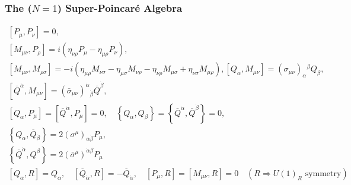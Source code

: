 \documentclass[10pt,aspectratio=169]{beamer}
\begin{document}
\begin{frame}
  \frametitle{The ($N = 1$) Super-Poincar\'{e} Algebra}
  \begin{gather*}
    \left [ P_\mu , P_\nu \right ] = 0 , \\[0.5em]
    \left [ M_{\mu\nu}, P_\rho \right ] = i \left ( \eta_{\nu \rho} P_\mu
    - \eta_{\mu\rho} P_\nu \right ) , \\[0.5em]
    \left [ M_{\mu\nu}, M_{\rho\sigma} \right ] = -i \left ( \eta_{\mu \rho}
    M_{\nu\sigma} - \eta_{\mu\sigma} M_{\nu\rho} - \eta_{\nu\rho} M_{\mu\sigma}
    + \eta_{\nu\sigma} M_{\mu\rho} \right ) ,
    \left [ Q_\alpha, M_{\mu\nu} \right ] = \left ( \sigma_{\mu\nu}
    \right )_\alpha{}^\beta Q_\beta , \\[0.5em]
    \left [ \overline{Q}^{\dot{\alpha}}, M_{\mu\nu} \right ] = \left (
    \bar{\sigma}_{\mu\nu} \right )^{\dot{\alpha}}{}_{\dot{\beta}}
    \overline{Q}^{\dot{\beta}} , \\[0.5em]
    \left [ Q_\alpha, P_\mu \right ] = \left [ \overline{Q}^{\dot{\alpha}},
      P_\mu \right ] = 0 , \quad
    \left \{ Q_\alpha , Q_\beta \right \} = \left \{ \overline{Q}^{\dot{\alpha}}
    , \overline{Q}^{\dot{\beta}} \right \} = 0 , \\[0.5em]
    \left \{ Q_\alpha, \overline{Q}_{\dot{\beta}} \right \} =
    2 \left ( \sigma^\mu \right )_{\alpha \dot{\beta}} P_\mu , \\[0.5em]
    \left \{ \overline{Q}^{\dot{\alpha}} , Q^\beta \right \} =
    2 \left ( \bar{\sigma}^\mu \right)^{\dot{\alpha}\beta} P_\mu \\[0.5em]
    \left [ Q_\alpha, R \right ] = Q_\alpha, \quad \left [
      \overline{Q}_{\dot{\alpha}}, R \right ] = -\overline{Q}_{\dot{\alpha}} ,
    \quad \left [ P_\mu, R \right ] = \left [ M_{\mu\nu}, R \right ]
    = 0 \quad (R \Rightarrow U(1)_R \text{ symmetry})
  \end{gather*}
\end{frame}
\end{document}
